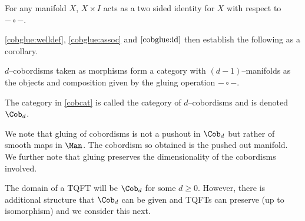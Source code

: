 \begin{lem}\label{cobglue:id}
For any manifold $X$, $X \times I$ acts as a two sided identity for $X$ with
respect to $- \circ -$.
\end{lem}

\ref{cobglue:welldef}, \ref{cobglue:assoc} and $\ref{cobglue:id}$ then establish
the following as a corollary.

\begin{thm}\label{cobcat}
$d$--cobordisms taken as morphisms form a category with $(d - 1)$--manifolds as
the objects and composition given by the gluing operation $- \circ -$.
\end{thm}

\begin{defn}[{$\Cob_d$}]
The category in \ref{cobcat} is called the category of $d$--cobordisms and is
denoted $\Cob_d$.
\end{defn}

\begin{rmk}
We note that gluing of cobordisms is not a pushout in $\Cob_d$ but rather of
smooth maps in $\Man$. The cobordism so obtained is the pushed out manifold. We
further note that gluing preserves the dimensionality of the cobordisms
involved.
\end{rmk}

The domain of a TQFT will be $\Cob_d$ for some $d \geq 0$. However, there is
additional structure that $\Cob_d$ can be given and TQFTs can preserve (up to
isomorphism) and we consider this next.

